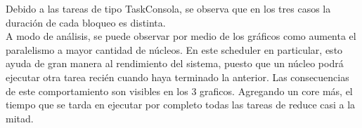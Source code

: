 \indent Debido a las tareas de tipo TaskConsola, se observa que en los tres casos la duración 
de cada bloqueo es distinta.\\
\indent A modo de análisis, se puede observar por medio de los gráficos como aumenta el paralelismo a mayor cantidad de núcleos. 
En este scheduler en particular, esto ayuda de gran manera al rendimiento del sistema, puesto que un núcleo podrá ejecutar otra tarea 
recién cuando haya terminado la anterior. Las consecuencias de este comportamiento son visibles en los 3 graficos. Agregando un core más, 
el tiempo que se tarda en ejecutar por completo todas las tareas de reduce casi a la mitad.\\